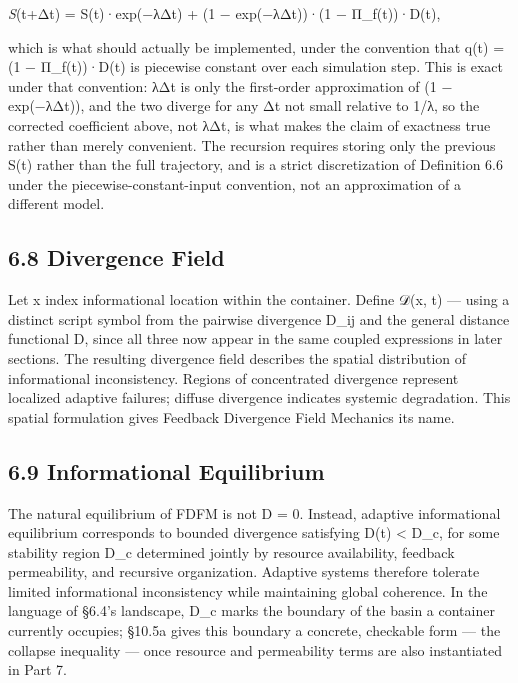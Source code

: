 \documentclass[
]{article}
\begin{document}
\emph{S}(t+Δt) = S(t)·exp(−λΔt) + (1 − exp(−λΔt))·(1 − Π\_f(t))·D(t),

which is what should actually be implemented, under the convention that
q(t) = (1 − Π\_f(t))·D(t) is piecewise constant over each simulation
step. This is exact under that convention: λΔt is only the first-order
approximation of (1 − exp(−λΔt)), and the two diverge for any Δt not
small relative to 1/λ, so the corrected coefficient above, not λΔt, is
what makes the claim of exactness true rather than merely convenient.
The recursion requires storing only the previous S(t) rather than the
full trajectory, and is a strict discretization of Definition 6.6 under
the piecewise-constant-input convention, not an approximation of a
different model.

\hypertarget{divergence-field}{%
\subsection{6.8 Divergence Field}\label{divergence-field}}

Let x index informational location within the container. Define 𝒟(x, t)
--- using a distinct script symbol from the pairwise divergence D\_ij
and the general distance functional D, since all three now appear in the
same coupled expressions in later sections. The resulting divergence
field describes the spatial distribution of informational inconsistency.
Regions of concentrated divergence represent localized adaptive
failures; diffuse divergence indicates systemic degradation. This
spatial formulation gives Feedback Divergence Field Mechanics its name.

\hypertarget{informational-equilibrium}{%
\subsection{6.9 Informational
Equilibrium}\label{informational-equilibrium}}

The natural equilibrium of FDFM is not D = 0. Instead, adaptive
informational equilibrium corresponds to bounded divergence satisfying
D(t) \textless{} D\_c, for some stability region D\_c determined jointly
by resource availability, feedback permeability, and recursive
organization. Adaptive systems therefore tolerate limited informational
inconsistency while maintaining global coherence. In the language of
§6.4's landscape, D\_c marks the boundary of the basin a container
currently occupies; §10.5a gives this boundary a concrete, checkable
form --- the collapse inequality --- once resource and permeability
terms are also instantiated in Part 7.
\end{document}

